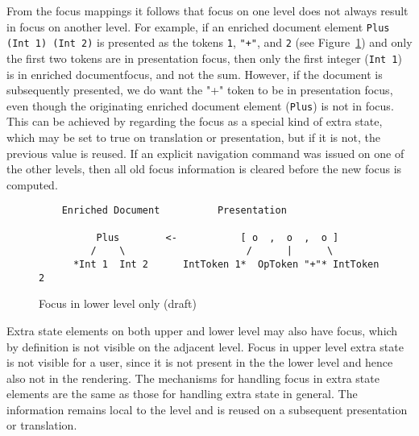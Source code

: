 From the focus mappings it follows that focus on one level does not always result in focus on another level. For example, if an enriched document element \verb|Plus (Int 1) (Int 2)| is presented as the tokens \verb|1|, \verb|"+"|, and \verb|2| (see Figure~\ref{lowerLevelFocus}) and only the first two tokens are in presentation focus, then only the first integer (\verb|Int 1|) is in enriched documentfocus, and not the sum. However, if the document is subsequently presented, we do want the "+" token to be in presentation focus, even though the originating enriched document element (\verb|Plus|) is not in focus. This can be achieved by regarding the focus as a special kind of extra state, which may be set to true on translation or presentation, but if it is not, the previous value is reused. If an explicit navigation command was issued on one of the other levels, then all old focus information is cleared before the new focus is computed. 

\begin{figure}
\begin{small}
\begin{center}
\begin{verbatim}
    Enriched Document          Presentation
    
          Plus        <-           [ o  ,  o  ,  o ]
         /    \                     /      |      \   
      *Int 1  Int 2      IntToken 1*  OpToken "+"* IntToken 2
\end{verbatim}
\caption{Focus in lower level only (draft)} \label{lowerLevelFocus} 
\end{center}
\end{small}
\end{figure}

Extra state elements on both upper and lower level may also have focus, which by definition is not visible on the adjacent level. Focus in upper level extra state is not visible for a user, since it is not present in the the lower level and hence also not in the rendering. The mechanisms for handling focus in extra state elements are the same as those for handling extra state in general. The information remains local to the level and is reused on a subsequent presentation or translation. 

